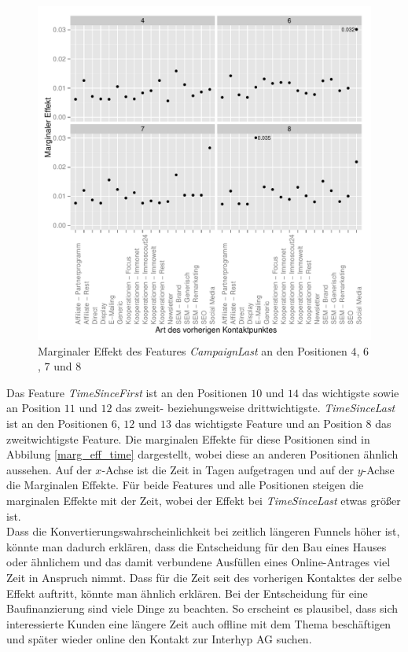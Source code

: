 \begin{figure}[H]
	\centering\includegraphics[scale=0.75]{marg_eff_campaignLast.pdf}\caption{Marginaler Effekt des Features \textit{CampaignLast} an den Positionen $4$, $6$, $7$ und $8$}\label{marg_eff_campaignLast}
\end{figure}
Das Feature \textit{TimeSinceFirst} ist an den Positionen $10$ und $14$ das wichtigste sowie an Position $11$ und $12$ das zweit- beziehungsweise drittwichtigste. \textit{TimeSinceLast} ist an den Positionen $6$, $12$ und $13$ das wichtigste Feature und an Position $8$ das zweitwichtigste Feature. Die marginalen Effekte für diese Positionen sind in Abbilung \ref{marg_eff_time} dargestellt, wobei diese an anderen Positionen ähnlich aussehen. Auf der $x$-Achse ist die Zeit in Tagen aufgetragen und auf der $y$-Achse die Marginalen Effekte. Für beide Features und alle Positionen steigen die marginalen Effekte mit der Zeit, wobei der Effekt bei \textit{TimeSinceLast} etwas größer ist.\\
Dass die Konvertierungswahrscheinlichkeit bei zeitlich längeren Funnels höher ist, könnte man dadurch erklären, dass die Entscheidung für den Bau eines Hauses oder ähnlichem und das damit verbundene Ausfüllen eines Online-Antrages viel Zeit in Anspruch nimmt. Dass für die Zeit seit des vorherigen Kontaktes der selbe Effekt auftritt, könnte man ähnlich erklären. Bei der Entscheidung für eine Baufinanzierung sind viele Dinge zu beachten. So erscheint es plausibel, dass sich interessierte Kunden eine längere Zeit auch offline mit dem Thema beschäftigen und später wieder online den Kontakt zur Interhyp AG suchen.
